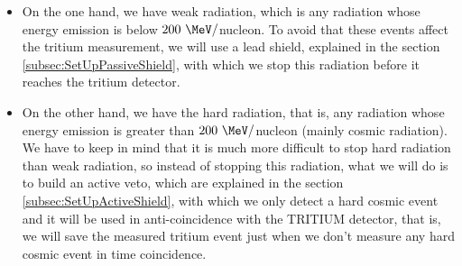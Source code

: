 \begin{itemize}

\item{}  On the one hand, we have weak radiation, which is any radiation whose energy emission is below $200~\MeV/$nucleon. To avoid that these events affect the tritium measurement, we will use a lead shield, explained in the section \ref{subsec:SetUpPassiveShield}, with which we stop this radiation before it reaches the tritium detector.

\item{} On the other hand, we have the hard radiation, that is, any radiation whose energy emission is greater than $200~\MeV/$nucleon (mainly cosmic radiation). We have to keep in mind that it is much more difficult to stop hard radiation than weak radiation, so instead of stopping this radiation, what we will do is to build an active veto, which are explained in the section \ref{subsec:SetUpActiveShield}, with which we only detect a hard cosmic event and it will be used in anti-coincidence with the TRITIUM detector, that is, we will save the measured tritium event just when we don't measure any hard cosmic event in time coincidence.

\end{itemize}